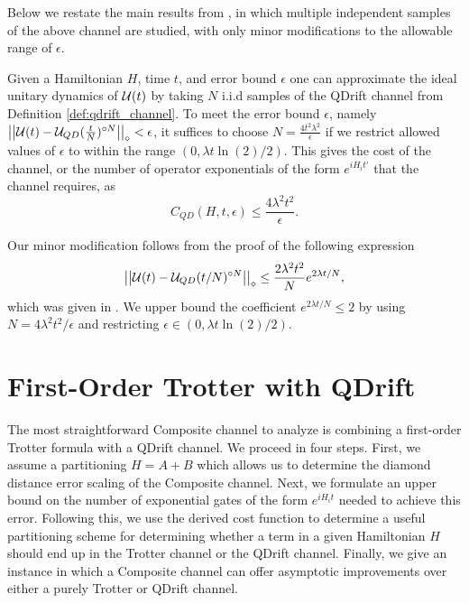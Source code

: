 Below we restate the main results from \cite{qdrift}, in which multiple independent samples of the above channel are studied, with only minor modifications to the allowable range of $\epsilon$.
\begin{theorem}[QDrift] \label{thm:QDrift}
    Given a Hamiltonian $H$, time $t$, and error bound $\epsilon$ one can approximate the ideal unitary dynamics of $\mathcal{U}(t)$ by taking $N$ i.i.d samples of the QDrift channel from Definition \ref{def:qdrift_channel}. To meet the error bound $\epsilon$, namely $\left| \left| \mathcal{U}(t) - \mathcal{U}_{QD}(\frac{t}{N})^{\circ N} \right| \right|_\diamond < \epsilon$, it suffices to choose $N = \frac{4 t^2 \lambda^2}{\epsilon}$ if we restrict allowed values of $\epsilon$ to within the range $(0, \lambda t \ln (2)/2)$. This gives the cost of the channel, or the number of operator exponentials of the form $e^{i H_i t'}$ that the channel requires, as
    \begin{equation}
        C_{QD}(H, t, \epsilon) \leq \frac{4 \lambda^2 t^2}{\epsilon}.
    \end{equation}
\end{theorem}

Our minor modification follows from the proof of the following expression
\begin{equation}
    \left| \left| \mathcal{U}(t) - \mathcal{U}_{QD}(t/N)^{\circ N} \right| \right|_\diamond \leq \frac{2 \lambda^2 t^2}{N} e^{2 \lambda t / N}, \label{eq:qdrift_diamond_distance}
\end{equation}
which was given in \cite{qdrift}. We upper bound the coefficient $e^{2 \lambda t/N} \leq 2$ by using $N = 4 \lambda^2 t^2 /\epsilon$ and restricting $\epsilon \in (0, \lambda t \ln(2)/2)$. 



\section{First-Order Trotter with QDrift}\label{sec:first_order_trotter}
The most straightforward Composite channel to analyze is combining a first-order Trotter formula with a QDrift channel. We proceed in four steps. First, we assume a partitioning $H = A + B$ which allows us to determine the diamond distance error scaling of the Composite channel. Next, we formulate an upper bound on the number of exponential gates of the form $e^{i H_i t}$ needed to achieve this error. Following this, we use the derived cost function to determine a useful partitioning scheme for determining whether a term in a given Hamiltonian $H$ should end up in the Trotter channel or the QDrift channel. Finally, we give an instance in which a Composite channel can offer asymptotic improvements over either a purely Trotter or QDrift
channel.

